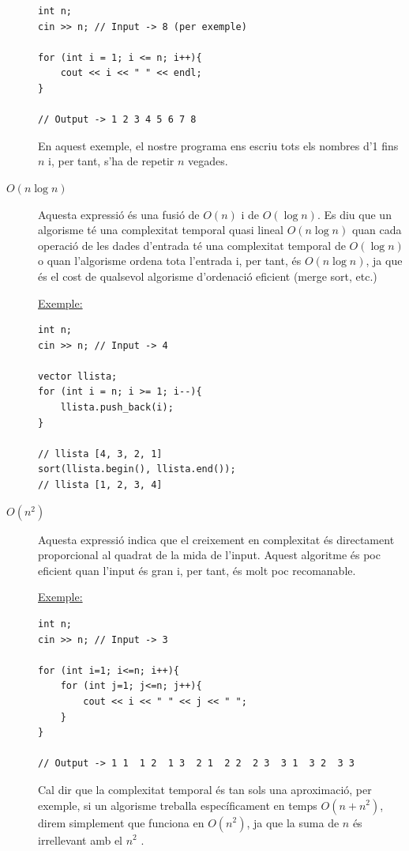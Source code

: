 \begin{description}
\begin{lstlisting}
int n;
cin >> n; // Input -> 8 (per exemple)

for (int i = 1; i <= n; i++){
    cout << i << " " << endl;
}

// Output -> 1 2 3 4 5 6 7 8

\end{lstlisting}

En aquest exemple, el nostre programa ens escriu tots els nombres d'1 fins $n$ i, per tant, s'ha de repetir $n$ vegades. \newpage

\item[$O(n \log n)$]

Aquesta expressió és una fusió de $O(n)$ i de $O(\log n)$.
Es diu que un algorisme té una complexitat temporal quasi lineal $O(n \log n)$ quan cada operació de les dades d'entrada té una complexitat temporal de $O(\log n)$ o quan l'algorisme ordena tota l'entrada i, per tant, és $O(n \log n)$, ja que és el cost de qualsevol algorisme d'ordenació eficient (merge sort, etc.) \newline

\underline{Exemple:} \newline

\begin{lstlisting}
int n;
cin >> n; // Input -> 4

vector llista;
for (int i = n; i >= 1; i--){
    llista.push_back(i);
}

// llista [4, 3, 2, 1]
sort(llista.begin(), llista.end());
// llista [1, 2, 3, 4]

\end{lstlisting}

\item[$O(n^2)$]

Aquesta expressió indica que el creixement en complexitat és directament proporcional al quadrat de la mida de l'input.
Aquest algoritme és poc eficient quan l'input és gran i, per tant, és molt poc recomanable. \newline

\underline{Exemple:} \newline

\begin{lstlisting}
int n;
cin >> n; // Input -> 3

for (int i=1; i<=n; i++){
    for (int j=1; j<=n; j++){
        cout << i << " " << j << " ";
    }
}

// Output -> 1 1  1 2  1 3  2 1  2 2  2 3  3 1  3 2  3 3
\end{lstlisting}
\newpage

Cal dir que la complexitat temporal és tan sols una aproximació, per exemple, si un algorisme treballa específicament en temps $O(n + n^2)$, direm simplement que funciona en $O(n^2)$, ja que la suma de $n$ és irrellevant amb el $n^2$ . \newline

\end{description}

